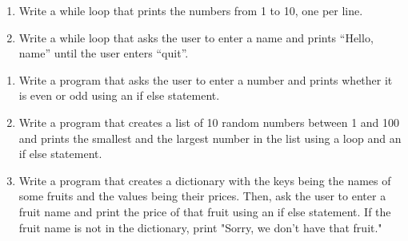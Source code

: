 \documentclass{homework}
\begin{document}
\newpage
\begin{problem}

\begin{enumerate}
\item Write a while loop that prints the numbers from 1 to 10, one per line.
\item Write a while loop that asks the user to enter a name and prints “Hello, name” until the user enters “quit”.
\end{enumerate}
\end{problem}

\begin{problem}[3 - Contitionals]
    \begin{enumerate}
    \item Write a program that asks the user to enter a number and prints whether it is even or odd using an if else statement.
    \item Write a program that creates a list of 10 random numbers between 1 and 100 and prints the smallest and the largest number in the list using a loop and an if else statement.
    \item Write a program that creates a dictionary with the keys being the names of some fruits and the values being their prices. Then, ask the user to enter a fruit name and print the price of that fruit using an if else statement. If the fruit name is not in the dictionary, print "Sorry, we don't have that fruit."
    \end{enumerate}
\end{problem}
\end{document}
